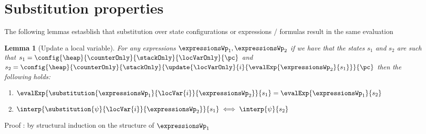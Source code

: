 
\newtheorem{substHeap}{Lemma}[section]
\newtheorem{newHeap}[substHeap]{Lemma}
\newtheorem{substStack}[substHeap]{Lemma}
\newtheorem{substCntr}[substHeap]{Lemma}
\newtheorem{substLv}[substHeap]{Lemma}
\newtheorem{substRet}[substHeap]{Lemma}




\section{Substitution properties}\label{substProp}

The following lemmas estasblish that substitution over state configurations or expressions / formulas result in the same evaluation


\begin{substLv}[Update  a local variable]\label{substLv}
For any expressions $ \expressionsWp_1, \expressionsWp_2 $ 
if we have that the states $s_1$ and $s_2$ are such that
$ s_1 =   \config{\heap}{\counterOnly}{ \stackOnly }{\locVarOnly}{\pc }$ and 
$ s_2 =   \config{\heap}{\counterOnly }{ \stackOnly }{\update{\locVarOnly}{i}{ \evalExp{ \expressionsWp_2}{ s_1 } }}{\pc }  $ then 
the following holds:
\begin{enumerate}
      \item $\evalExp{\substitution{\expressionsWp_1}{ \locVar{i} }{ \expressionsWp_2 }}{ s_1 } = \evalExp{\expressionsWp_1}{s_2} $
      \item $\interp{\substitution{\psi}{ \locVar{i} }{ \expressionsWp_2 }}{ s_1 } \iff \interp{\psi}{s_2} $
\end{enumerate}
\end{substLv}
Proof : by structural induction on the structure of $\expressionsWp_1$ 
